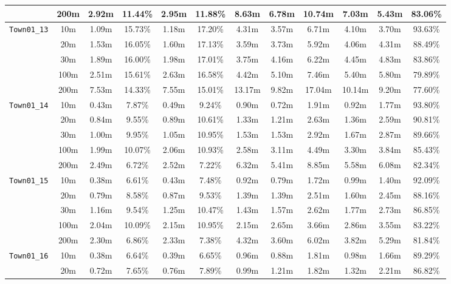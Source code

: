 \begin{table}
{\begin{tabular}{@{}cccccccccccc@{}}
      & 200m & 2.92m & 11.44\% & 2.95m & 11.88\% & 8.63m & 6.78m & 10.74m & 7.03m & 5.43m & 83.06\% \\
      \midrule
      \multirow{5}{*}{\Verb|Town01_13|} & 10m & 1.09m & 15.73\% & 1.18m & 17.20\% & 4.31m & 3.57m & 6.71m & 4.10m & 3.70m & 93.63\% \\
      & 20m & 1.53m & 16.05\% & 1.60m & 17.13\% & 3.59m & 3.73m & 5.92m & 4.06m & 4.31m & 88.49\% \\
      & 30m & 1.89m & 16.00\% & 1.98m & 17.01\% & 3.75m & 4.16m & 6.22m & 4.45m & 4.83m & 83.86\% \\
      & 100m & 2.51m & 15.61\% & 2.63m & 16.58\% & 4.42m & 5.10m & 7.46m & 5.40m & 5.80m & 79.89\% \\
      & 200m & 7.53m & 14.33\% & 7.55m & 15.01\% & 13.17m & 9.82m & 17.04m & 10.14m & 9.20m & 77.60\% \\
      \midrule
      \multirow{5}{*}{\Verb|Town01_14|} & 10m & 0.43m & 7.87\% & 0.49m & 9.24\% & 0.90m & 0.72m & 1.91m & 0.92m & 1.77m & 93.80\% \\
      & 20m & 0.84m & 9.55\% & 0.89m & 10.61\% & 1.33m & 1.21m & 2.63m & 1.36m & 2.59m & 90.81\% \\
      & 30m & 1.00m & 9.95\% & 1.05m & 10.95\% & 1.53m & 1.53m & 2.92m & 1.67m & 2.87m & 89.66\% \\
      & 100m & 1.99m & 10.07\% & 2.06m & 10.93\% & 2.58m & 3.11m & 4.49m & 3.30m & 3.84m & 85.43\% \\
      & 200m & 2.49m & 6.72\% & 2.52m & 7.22\% & 6.32m & 5.41m & 8.85m & 5.58m & 6.08m & 82.34\% \\
      \midrule
      \multirow{5}{*}{\Verb|Town01_15|} & 10m & 0.38m & 6.61\% & 0.43m & 7.48\% & 0.92m & 0.79m & 1.72m & 0.99m & 1.40m & 92.09\% \\
      & 20m & 0.79m & 8.58\% & 0.87m & 9.53\% & 1.39m & 1.39m & 2.51m & 1.60m & 2.45m & 88.16\% \\
      & 30m & 1.16m & 9.54\% & 1.25m & 10.47\% & 1.43m & 1.57m & 2.62m & 1.77m & 2.73m & 86.85\% \\
      & 100m & 2.04m & 10.09\% & 2.15m & 10.95\% & 2.15m & 2.65m & 3.66m & 2.86m & 3.55m & 83.22\% \\
      & 200m & 2.30m & 6.86\% & 2.33m & 7.38\% & 4.32m & 3.60m & 6.02m & 3.82m & 5.29m & 81.84\% \\
      \midrule
      \multirow{5}{*}{\Verb|Town01_16|} & 10m & 0.38m & 6.64\% & 0.39m & 6.65\% & 0.96m & 0.88m & 1.81m & 0.98m & 1.66m & 89.29\% \\
      & 20m & 0.72m & 7.65\% & 0.76m & 7.89\% & 0.99m & 1.21m & 1.82m & 1.32m & 2.21m & 86.82\% \\

\end{tabular}}
\end{table}
